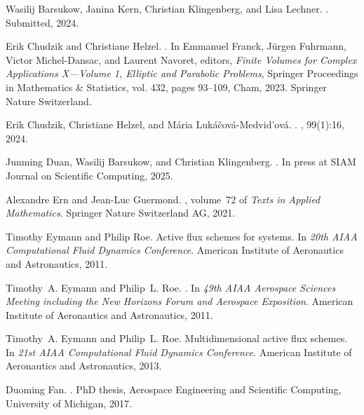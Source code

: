 \documentclass[12pt,a4paper]{article}
\begin{document}
\begin{thebibliography}{LMMW00}
Wasilij Barsukow, Janina Kern, Christian Klingenberg, and Lisa Lechner.
.
\newblock Submitted, 2024.

Erik Chudzik and Christiane Helzel.
.
\newblock In Emmanuel Franck, J{\"u}rgen Fuhrmann, Victor Michel-Dansac, and
  Laurent Navoret, editors, {\em Finite Volumes for Complex Applications
  X---Volume 1, Elliptic and Parabolic Problems}, Springer Proceedings in
  Mathematics \& Statistics, vol. 432, pages 93--109, Cham, 2023. Springer
  Nature Switzerland.

Erik Chudzik, Christiane Helzel, and M{\'a}ria
  Luk{\'a}{\v{c}}ov{\'a}-Medvid'ov{\'a}.
.
, 99(1):16, 2024.

Junming Duan, Wasilij Barsukow, and Christian Klingenberg.
.
\newblock In press at SIAM Journal on Scientific Computing, 2025.

Alexandre Ern and Jean-Luc Guermond.
, volume~72
  of {\em Texts in Applied Mathematics}.
\newblock Springer Nature Switzerland AG, 2021.

Timothy Eymann and Philip Roe.
\newblock Active flux schemes for systems.
\newblock In {\em 20th AIAA Computational Fluid Dynamics Conference}. American
  Institute of Aeronautics and Astronautics, 2011.

Timothy~A. Eymann and Philip~L. Roe.
.
\newblock In {\em 49th AIAA Aerospace Sciences Meeting including the New
  Horizons Forum and Aerospace Exposition}. American Institute of Aeronautics
  and Astronautics, 2011.

Timothy~A. Eymann and Philip~L. Roe.
\newblock Multidimensional active flux schemes.
\newblock In {\em 21st AIAA Computational Fluid Dynamics Conference}. American
  Institute of Aeronautics and Astronautics, 2013.

Duoming Fan.
.
\newblock PhD thesis, Aerospace Engineering and Scientific Computing,
  University of Michigan, 2017.


\end{thebibliography}
\end{document}
